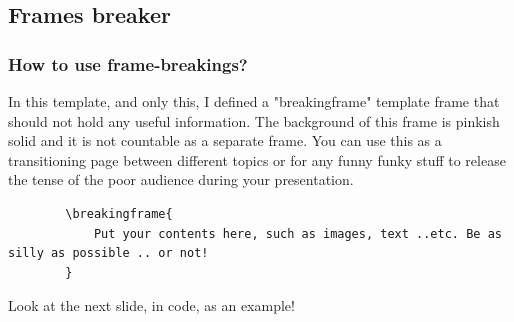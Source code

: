 \documentclass{EESD}
\begin{document}
\subsection{Frames breaker}
\begin{frame}[fragile]
\frametitle{How to use frame-breakings?}
    In this template, and only this, I defined a "breakingframe" template frame that should not hold any useful information. The background of this frame is pinkish solid and it is not countable as a separate frame. You can use this as a transitioning page between different topics or for any funny funky stuff to release the tense of the poor audience during your presentation.
    \vspace{10pt}
    \begin{lstlisting}
        \breakingframe{
            Put your contents here, such as images, text ..etc. Be as silly as possible .. or not!
        }
    \end{lstlisting}
    \vspace{10pt}
    Look at the next slide, in code, as an example!
\end{frame}

\end{document}
